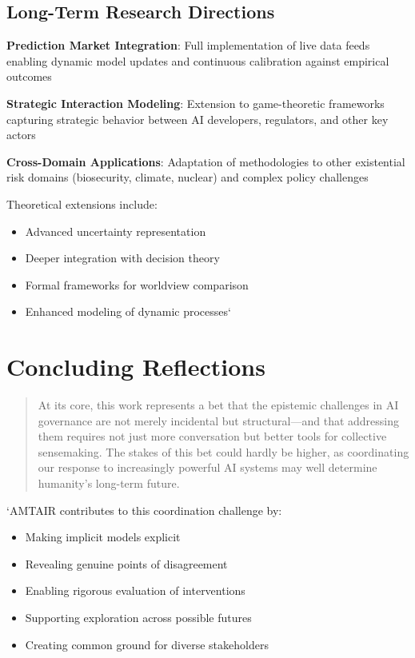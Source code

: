 \documentclass[
  11pt,
  letterpaper,
]{book}
\providecommand{\tightlist}{%
  \setlength{\itemsep}{0pt}\setlength{\parskip}{0pt}}
\begin{document}
\subsection{Long-Term Research Directions}\label{sec-long-term-research}

\textbf{Prediction Market Integration}: Full implementation of live data
feeds enabling dynamic model updates and continuous calibration against
empirical outcomes

\textbf{Strategic Interaction Modeling}: Extension to game-theoretic
frameworks capturing strategic behavior between AI developers,
regulators, and other key actors

\textbf{Cross-Domain Applications}: Adaptation of methodologies to other
existential risk domains (biosecurity, climate, nuclear) and complex
policy challenges

Theoretical extensions include:

\begin{itemize}
\tightlist
\item
  Advanced uncertainty representation
\item
  Deeper integration with decision theory
\item
  Formal frameworks for worldview comparison
\item
  Enhanced modeling of dynamic processes`
\end{itemize}

\section{Concluding Reflections}\label{sec-concluding-reflections}

\begin{quote}
At its core, this work represents a bet that the epistemic challenges in
AI governance are not merely incidental but structural---and that
addressing them requires not just more conversation but better tools for
collective sensemaking. The stakes of this bet could hardly be higher,
as coordinating our response to increasingly powerful AI systems may
well determine humanity's long-term future.
\end{quote}

`AMTAIR contributes to this coordination challenge by:

\begin{itemize}
\tightlist
\item
  Making implicit models explicit
\item
  Revealing genuine points of disagreement
\item
  Enabling rigorous evaluation of interventions
\item
  Supporting exploration across possible futures
\item
  Creating common ground for diverse stakeholders
\end{itemize}
\end{document}
